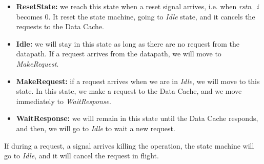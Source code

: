 \begin{itemize}
    \item \textbf{ResetState:} we reach this state when a reset signal arrives, i.e. when \textit{rstn\_i} becomes 0. It reset the state machine, going to \textit{Idle} state, and it cancels the requests to the Data Cache.
    \item \textbf{Idle:} we will stay in this state as long as there are no request from the datapath. If a request arrives from the datapath, we will move to \textit{MakeRequest}.
    \item \textbf{MakeRequest:} if a request arrives when we are in \textit{Idle}, we will move to this state. In this state, we make a request to the Data Cache, and we move immediately to \textit{WaitResponse}.
    \item \textbf{WaitResponse:} we will remain in this state until the Data Cache responds, and then, we will go to \textit{Idle} to wait a new request.
\end{itemize}

If during a request, a signal arrives killing the operation, the state machine will go to \textit{Idle}, and it will cancel the request in flight.

